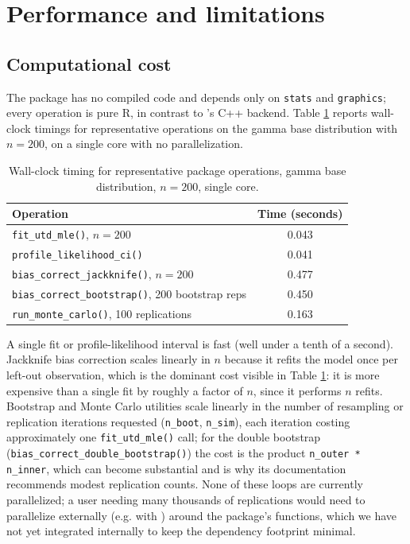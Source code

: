 \section{Performance and limitations}
\label{sec:performance}

\subsection{Computational cost}

The package has no compiled code and depends only on \texttt{stats} and
\texttt{graphics}; every operation is pure R, in contrast to
's C++ backend. Table \ref{tab:timing} reports wall-clock
timings for representative operations on the gamma base distribution
with $n=200$, on a single core with no parallelization.

\begin{table}[htbp]
\centering
\begin{tabular}{@{}lc@{}}
\toprule
Operation & Time (seconds) \\
\midrule
\texttt{fit\_utd\_mle()}, $n=200$ & 0.043 \\
\texttt{profile\_likelihood\_ci()} & 0.041 \\
\texttt{bias\_correct\_jackknife()}, $n=200$ & 0.477 \\
\texttt{bias\_correct\_bootstrap()}, 200 bootstrap reps & 0.450 \\
\texttt{run\_monte\_carlo()}, 100 replications & 0.163 \\
\bottomrule
\end{tabular}
\caption{Wall-clock timing for representative package operations, gamma
base distribution, $n=200$, single core.}
\label{tab:timing}
\end{table}

A single fit or profile-likelihood interval is fast (well under a tenth
of a second). Jackknife bias correction scales linearly in $n$ because
it refits the model once per left-out observation, which is the
dominant cost visible in Table \ref{tab:timing}: it is more expensive
than a single fit by roughly a factor of $n$, since it performs $n$
refits. Bootstrap and Monte Carlo utilities scale linearly in the
number of resampling or replication iterations requested
(\texttt{n\_boot}, \texttt{n\_sim}), each iteration costing
approximately one \texttt{fit\_utd\_mle()} call; for the double
bootstrap (\texttt{bias\_correct\_double\_bootstrap()}) the cost is the
product \texttt{n\_outer * n\_inner}, which can become substantial and
is why its documentation recommends modest replication counts. None of
these loops are currently parallelized; a user needing many thousands
of replications would need to parallelize externally (e.g. with
) around the package's functions, which we have
not yet integrated internally to keep the dependency footprint minimal.

